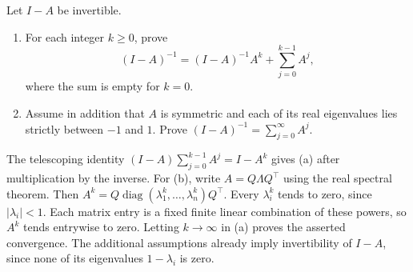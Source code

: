 \begin{problem}\label{ex:09:geometric-series}
Let \(I-A\) be invertible.
\begin{enumerate}
\item For each integer \(k\geqslant0\), prove
\[
 (I-A)^{-1}=(I-A)^{-1}A^k+\sum_{j=0}^{k-1}A^j,
\]
where the sum is empty for \(k=0\).
\item Assume in addition that \(A\) is symmetric and each of its real
eigenvalues lies strictly between \(-1\) and \(1\).
Prove \((I-A)^{-1}=\sum_{j=0}^\infty A^j\).
\end{enumerate}
\end{problem}
\begin{solution}
The telescoping identity
\((I-A)\sum_{j=0}^{k-1}A^j=I-A^k\)
gives (a) after multiplication by the inverse.
For (b), write \(A=Q\Lambda Q^\top\) using the real spectral theorem.
Then \(A^k=Q\operatorname{diag}(\lambda_1^k,\ldots,\lambda_n^k)Q^\top\).
Every \(\lambda_i^k\) tends to zero, since \(|\lambda_i|<1\).
Each matrix entry is a fixed finite linear combination of these powers,
so \(A^k\) tends entrywise to zero.
Letting \(k\to\infty\) in (a) proves the asserted convergence.
The additional assumptions already imply invertibility of \(I-A\),
since none of its eigenvalues \(1-\lambda_i\) is zero.
\end{solution}

